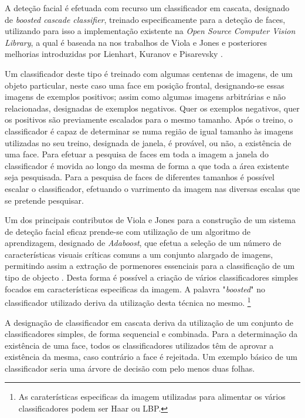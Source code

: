 A deteção facial é efetuada com recurso um classificador em cascata, designado de \textit{boosted cascade classifier},  treinado especificamente para a deteção de faces, utilizando para isso a implementação existente na \textit{Open Source Computer Vision Library}, a qual é baseada na nos trabalhos de Viola e Jones \cite{Viola2001} e posteriores melhorias introduzidas por Lienhart, Kuranov e Pisarevsky \cite{Lienhart2003}.

Um classificador deste tipo é treinado com algumas centenas de imagens, de um objeto particular, neste caso uma face em posição frontal, designando-se essas imagens de exemplos positivos; assim como algumas imagens arbitrárias e não relacionadas, designadas de exemplos negativos. Quer os exemplos negativos, quer os positivos são previamente escalados para o mesmo tamanho. Após o treino, o classificador é capaz de determinar se numa região de igual tamanho às imagens utilizadas no seu treino, designada de janela, é provável, ou não,  a existência de uma face. Para efetuar a pesquisa de faces em toda a imagem a janela do classificador é movida ao longo da mesma de forma a que toda a área existente seja pesquisada. Para a pesquisa de faces de diferentes tamanhos é possível escalar o classificador, efetuando o varrimento da imagem nas diversas escalas que se pretende pesquisar.

Um dos principais contributos de Viola e Jones para a construção de um sistema de deteção facial eficaz prende-se com utilização de um algoritmo de aprendizagem, designado de \textit{Adaboost}, que efetua a seleção de um número de características visuais críticas comuns a um conjunto alargado de imagens, permitindo assim a extração de pormenores essenciais para a classificação de um tipo de objecto \cite{Viola2001}. Desta forma é possível a criação de vários classificadores simples focados em características especificas da imagem. A palavra "\textit{boosted}" no classificador utilizado deriva da utilização desta técnica no mesmo. \footnote{As caraterísticas especificas da imagem utilizadas para alimentar os vários classificadores podem ser Haar ou LBP.}
 
A designação de classificador em cascata deriva da utilização de um conjunto de classificadores simples, de forma sequencial e combinada. Para a determinação da existência de uma face, todos os classificadores utilizados  têm de aprovar a existência da mesma, caso contrário a face é rejeitada. Um exemplo básico de um classificador seria uma árvore de decisão com pelo menos duas folhas.

